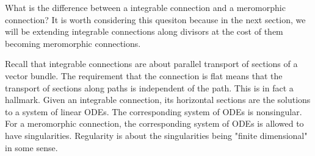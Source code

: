 \begin{remark}
	What is the difference between a integrable connection and a meromorphic connection?
	It is worth considering this quesiton because in the next section, we will be extending
	integrable connections along divisors at the cost of
	them becoming meromorphic connections.

	\hfill

	Recall that integrable connections are about parallel transport of sections of a vector bundle.
	The requirement that the connection is flat means that the transport of sections along paths
	is independent of the path. This is in fact a hallmark. Given an integrable connection, its
	horizontal sections are the solutions to a system of linear ODEs. The corresponding system of
	ODEs is nonsingular. For a meromorphic connection, the corresponding system of ODEs is
	allowed to have singularities. Regularity is about the singularities being "finite dimensional"
	in some sense.

\end{remark}

